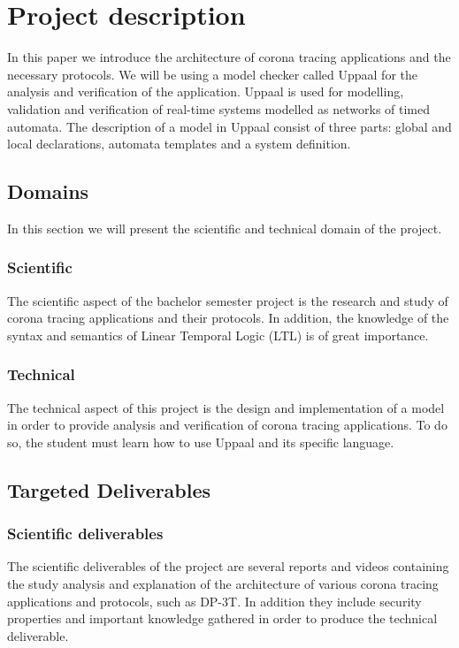 \documentclass[a4paper, twocolumn]{article}
\begin{document}
\section{Project description}
In this paper we introduce the architecture of corona tracing applications and the necessary protocols. We will be using a model checker called Uppaal \cite{uppaal} for the analysis and verification of the application. Uppaal is used for modelling, validation and verification of real-time systems modelled as networks of timed automata. The description of a model in Uppaal consist of three parts: global and local declarations, automata templates and a system definition.


\subsection{Domains}
In this section we will present the scientific and technical domain of the project.
\subsubsection{Scientific }
The scientific aspect of the bachelor semester project is the research and study of corona tracing applications and their protocols.
In addition, the knowledge of the syntax and semantics of Linear Temporal Logic (LTL) is of great importance.
\subsubsection{Technical}
The technical aspect of this project is the design and implementation of a model in order to provide analysis and verification of corona tracing applications. To do so, the student must learn how to use Uppaal and its specific language.

\subsection{Targeted Deliverables}
\label{sec-deliverables}
\subsubsection{Scientific deliverables}
The scientific deliverables of the project are several reports and videos containing the study analysis and explanation of the architecture of various corona tracing applications and protocols, such as DP-3T. In addition they include security properties and important knowledge gathered in order to produce the technical deliverable.
\end{document}
